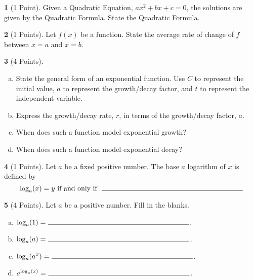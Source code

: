 \documentclass[12pt]{amsart}
\theoremstyle{definition}
\newtheorem{thm}{}
\begin{document}
\begin{thm}[1 Point]\label{def: quadratic formula}
  Given a Quadratic Equation, $ax^2 + bx + c = 0$, the solutions are given by the Quadratic Formula.  State the Quadratic Formula.
  \vspace{1in}
\end{thm}

\newpage

\begin{thm}[1 Points]
  Let $f(x)$ be a function.
  State the average rate of change of $f$ between $x = a$ and $x = b$.
  \vspace{1in}
\end{thm}

\begin{thm}[4 Points]
  \begin{enumerate}[(a)]
  \item
    State the general form of an exponential function.
    Use $C$ to represent the initial value, $a$ to represent the growth/decay factor, and $t$ to represent the independent variable.
    \vspace{1in}
  \item
    Express the growth/decay rate, $r$, in terms of the growth/decay factor, $a$.
    \vspace{1in}
  \item
    When does such a function model exponential growth?
    \vspace{1in}
  \item
    When does such a function model exponential decay?
    \vspace{1in}
  \end{enumerate}
\end{thm}

\begin{thm}[1 Points]
  Let $a$ be a fixed positive number.
  The base $a$ logarithm of $x$ is defined by
  \vspace{.15in}
  $$\log_a(x) = y\  \text{if and only if}\ \ \line(1,0){200}$$
\end{thm}

\begin{thm}[4 Points]
  Let $a$ be a positive number.  Fill in the blanks.
  \begin{enumerate}[(a)]
  \item
    \vspace{.5in}
    $\displaystyle{\log_a(1) = \ \line(1,0){200}}$.
    \vspace{.5in}
  \item
    $\displaystyle{\log_a(a) = \ \line(1,0){200}}$.
    \vspace{.5in}
  \item
    $\displaystyle{\log_a(a^x) = \ \line(1,0){200}}$.
    \vspace{.5in}
  \item
    $\displaystyle{a^{\log_a(x)} = \ \line(1,0){200}}$.
  \end{enumerate}
  \vspace{.5in}
\end{thm}
\end{document}
